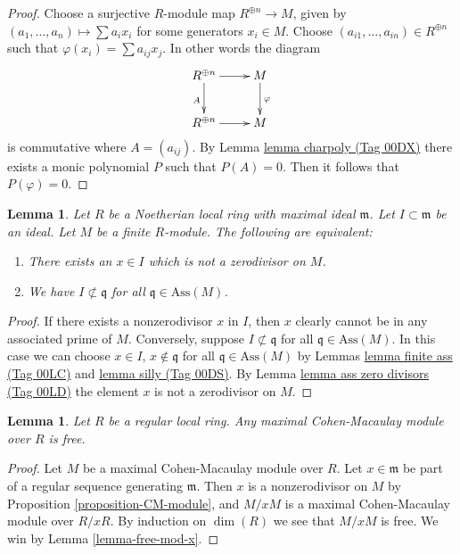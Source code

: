 \documentclass{amsart}
\theoremstyle{plain}
\newtheorem{lemma}[subsection]{Lemma}
\theoremstyle{definition}
\theoremstyle{remark}
\numberwithin{equation}{subsection}
\begin{document}
\begin{proof}
Choose a surjective $R$-module map $R^{\oplus n} \to M$, given by
$(a_1, \ldots, a_n) \mapsto \sum a_ix_i$ for some generators $x_i \in M$.
Choose $(a_{i1}, \ldots, a_{in}) \in R^{\oplus n}$ such that
$\varphi(x_i) = \sum a_{ij} x_j$. In other words the diagram
$$
\xymatrix{
R^{\oplus n} \ar[d]_A \ar[r] & M \ar[d]^\varphi \\
R^{\oplus n} \ar[r] & M
}
$$
is commutative where $A = (a_{ij})$. By
Lemma \href{https://stacks.math.columbia.edu/tag/00DX}{lemma charpoly (Tag 00DX)}
there exists a monic polynomial $P$ such that $P(A) = 0$.
Then it follows that $P(\varphi) = 0$.
\end{proof}


\begin{lemma}
\label{lemma-ideal-nonzerodivisor}
Let $R$ be a Noetherian local ring with
maximal ideal $\mathfrak m$. Let $I \subset \mathfrak m$
be an ideal. Let $M$ be a finite $R$-module.
The following are equivalent:
\begin{enumerate}
\item There exists an $x \in I$ which is not a zerodivisor on $M$.
\item We have $I \not \subset \mathfrak q$ for all
$\mathfrak q \in \text{Ass}(M)$.
\end{enumerate}
\end{lemma}

\begin{proof}
If there exists a nonzerodivisor $x$ in $I$,
then $x$ clearly cannot be in any associated
prime of $M$. Conversely, suppose $I \not \subset \mathfrak q$
for all $\mathfrak q \in \text{Ass}(M)$. In this case we can
choose $x \in I$, $x \not \in \mathfrak q$ for all
$\mathfrak q \in \text{Ass}(M)$ by Lemmas
\href{https://stacks.math.columbia.edu/tag/00LC}{lemma finite ass (Tag 00LC)} and \href{https://stacks.math.columbia.edu/tag/00DS}{lemma silly (Tag 00DS)}.
By Lemma \href{https://stacks.math.columbia.edu/tag/00LD}{lemma ass zero divisors (Tag 00LD)} the element $x$
is not a zerodivisor on $M$.
\end{proof}


\begin{lemma}
\label{lemma-regular-mcm-free}
Let $R$ be a regular local ring.
Any maximal Cohen-Macaulay module over $R$ is free.
\end{lemma}

\begin{proof}
Let $M$ be a maximal Cohen-Macaulay module over $R$.
Let $x \in \mathfrak m$ be part of a regular sequence
generating $\mathfrak m$. Then $x$ is a nonzerodivisor
on $M$ by Proposition \ref{proposition-CM-module}, and
$M/xM$ is a maximal Cohen-Macaulay module over $R/xR$.
By induction on $\dim(R)$ we see that $M/xM$ is free.
We win by Lemma \ref{lemma-free-mod-x}.
\end{proof}
\end{document}

